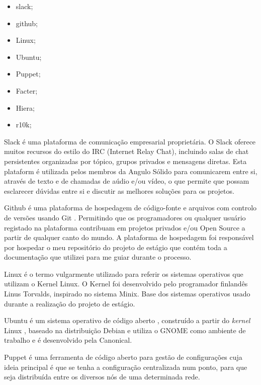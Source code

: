 \documentclass{article}
\begin{document}
\begin{itemize}
    \item slack;
	\item github;
	\item Linux;
	\item Ubuntu;
	\item Puppet;
	\item Facter;
	\item Hiera;
	\item r10k;
\end{itemize}

\cleardoublepage

Slack \cite{slack} é uma plataforma de comunicação empresarial proprietária. O Slack oferece muitos recursos do estilo do IRC (Internet Relay Chat), incluindo salas de chat persistentes organizadas por tópico, grupos privados e mensagens diretas.
Esta plataform é utilizada pelos membros da Angulo Sólido para comunicarem entre si, através de texto e de chamadas de aúdio e/ou vídeo, o que permite que possam esclarecer dúvidas entre si e discutir as melhores soluções para os projetos.

Github \cite{github} é uma plataforma de hospedagem de código-fonte e arquivos com controlo de versões usando Git \cite{git}. Permitindo que os programadores ou qualquer usuário registado na plataforma contribuam em projetos privados e/ou Open Source \cite{opensource} a partir de qualquer canto do mundo.
A plataforma de hospedagem foi responsável por hospedar o meu repositório do projeto de estágio que contém toda a documentação que utilizei para me guiar durante o processo.

Linux \cite{linux} é o termo vulgarmente utilizado para referir os sistemas operativos que utilizam o Kernel Linux. O Kernel foi desenvolvido pelo programador finlandês Linus Torvalds, inspirado no sistema Minix.
Base dos sistemas operativos usado durante a realização do projeto de estágio.

Ubuntu \cite{ubuntu} é um sistema operativo de código aberto \cite{opensource}, construído a partir do \textit{kernel} Linux \cite{linux}, baseado na distribuição Debian e utiliza o GNOME como ambiente de trabalho e é desenvolvido pela Canonical.

Puppet \cite{puppet} é uma ferramenta de código aberto \cite{opensource} para gestão de configurações cuja ideia principal é que se tenha a configuração centralizada num ponto, para que seja distribuída entre os diversos nós de uma determinada rede.
\end{document}
